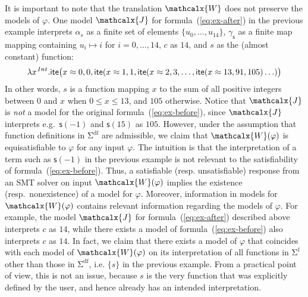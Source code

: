 \documentclass[runningheads,a4paper]{llncs}
\newcommand{\con}[1]{\mathsf{#1}}
\let\oldSigma=\Sigma
\def\Sigma{\mathrm{\oldSigma}}
\newcommand{\teq}{\approx}
\newcommand{\I}{\mathcalx{J}} %
\newcommand{\conv}{\mathcalx{W}}
\newcommand{\sfuns}[1]{#1^\mathrm{f}}
\newcommand{\sfundefs}[1]{#1^\mathrm{df}}
\newcommand{\lite}{\con{ite}}
\newcommand\concret{\gamma} %
\newcommand{\farg}[1]{\concret_{#1}}
\newcommand{\fargsort}[1]{\alpha_{#1}}
\newcommand{\vthinspace}{\kern+0.083333em}
\newcommand{\typ}[1]{^{\vthinspace #1}}
\begin{document}
It is important to note that the translation $\conv$ does not preserve the models of $\varphi$.
One model $\I$ for formula~(\ref{eq:ex-after}) in the previous example interprets 
$\fargsort{s}$ as a finite set of elements $\{ u_0, \ldots, u_{14} \}$,
$\farg{\con{s}}$ as a finite map mapping containing $u_i \mapsto i$ for $i = 0, \ldots, 14$,
$c$ as $14$, 
and $s$ as the (almost constant) function:
\begin{equation} \label{eq:approx-interp}
\lambda x\typ{Int}. \lite\bigl( x \teq 0, 0, \lite( x \teq 1, 1, \lite( x \teq 2, 3, \ldots, \lite( x \teq 13, 91, 105 ) \ldots )\bigr)
\end{equation}
In other words, $s$ is a function mapping $x$ to the sum of all positive integers between $0$ and $x$ when $0 \leq x \leq 13$,
and $105$ otherwise.
Notice that $\I$ is \emph{not} a model for the original formula~(\ref{eq:ex-before}),
since $\I$ interprets e.g.\ $\con{s}( -1 )$ and $\con{s}( 15 )$ as $105$.
However, under the assumption that function definitions in $\sfundefs{\Sigma}$ are admissible, 
we claim that $\conv(\varphi)$ is equisatisfiable to $\varphi$ for any input $\varphi$.
The intuition is that the interpretation of a term such as $\con{s}( -1 )$ in the previous example is not relevant to the satisfiability of formula~(\ref{eq:ex-before}).
Thus, a satisfiable (resp. unsatisfiable) response from an SMT solver on input $\conv( \varphi )$ implies the existence (resp.\ nonexistence) of a model for $\varphi$.
Moreover, information in models for $\conv( \varphi )$ contains relevant information regarding the models of $\varphi$.
For example, the model $\I$ for formula~(\ref{eq:ex-after}) described above interprets $c$ as $14$, 
while there exists a model of formula~(\ref{eq:ex-before}) also interprets $c$ as $14$.
In fact, we claim that there exists a model of $\varphi$ that coincides with each model of $\conv( \varphi )$ on its interpretation of all functions in $\sfuns{\Sigma}$ 
other than those in $\sfundefs{\Sigma}$, i.e. $\{ s \}$ in the previous example.
From a practical point of view, this is not an issue, because
$s$ is the very function that was explicitly defined by the user,
and hence already has an intended interpretation.
\end{document}

